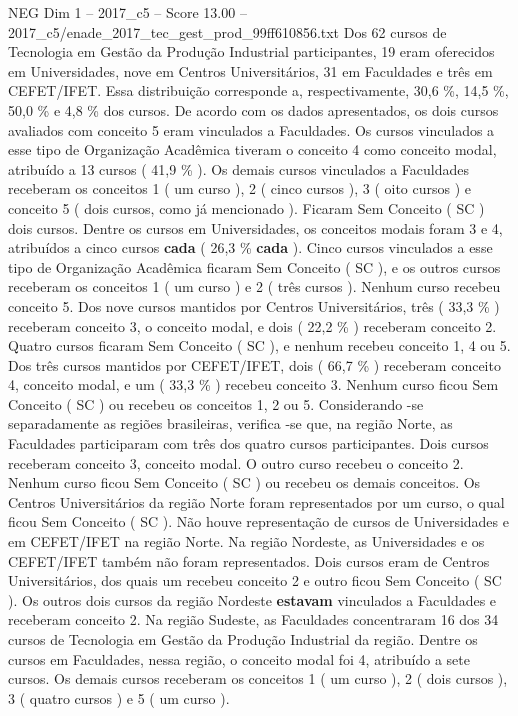 \begin{textsample}{NEG Dim 1 – 2017\_c5 – Score 13.00 – 2017\_c5/enade\_2017\_tec\_gest\_prod\_99ff610856.txt}
Dos 62 cursos de Tecnologia em Gestão da Produção Industrial participantes, 19 eram oferecidos em Universidades, nove em Centros Universitários, 31 em Faculdades e três em CEFET/IFET.
Essa distribuição corresponde a, respectivamente, 30,6 \%, 14,5 \%, 50,0 \% e 4,8 \% dos cursos.
De acordo com os dados apresentados, os dois cursos avaliados com conceito 5 eram vinculados a Faculdades.
Os cursos vinculados a esse tipo de Organização Acadêmica tiveram o conceito 4 como conceito modal, atribuído a 13 cursos ( 41,9 \% ).
Os demais cursos vinculados a Faculdades receberam os conceitos 1 ( um curso ), 2 ( cinco cursos ), 3 ( oito cursos ) e conceito 5 ( dois cursos, como já mencionado ).
Ficaram Sem Conceito ( SC ) dois cursos.
Dentre os cursos em Universidades, os conceitos modais foram 3 e 4, atribuídos a cinco cursos \textbf{cada} ( 26,3 \% \textbf{cada} ).
Cinco cursos vinculados a esse tipo de Organização Acadêmica ficaram Sem Conceito ( SC ), e os outros cursos receberam os conceitos 1 ( um curso ) e 2 ( três cursos ).
Nenhum curso recebeu conceito 5.
Dos nove cursos mantidos por Centros Universitários, três ( 33,3 \% ) receberam conceito 3, o conceito modal, e dois ( 22,2 \% ) receberam conceito 2.
Quatro cursos ficaram Sem Conceito ( SC ), e nenhum recebeu conceito 1, 4 ou 5.
Dos três cursos mantidos por CEFET/IFET, dois ( 66,7 \% ) receberam conceito 4, conceito modal, e um ( 33,3 \% ) recebeu conceito 3.
Nenhum curso ficou Sem Conceito ( SC ) ou recebeu os conceitos 1, 2 ou 5.
Considerando -se separadamente as regiões brasileiras, verifica -se que, na região Norte, as Faculdades participaram com três dos quatro cursos participantes.
Dois cursos receberam conceito 3, conceito modal.
O outro curso recebeu o conceito 2.
Nenhum curso ficou Sem Conceito ( SC ) ou recebeu os demais conceitos.
Os Centros Universitários da região Norte foram representados por um curso, o qual ficou Sem Conceito ( SC ).
Não houve representação de cursos de Universidades e em CEFET/IFET na região Norte.
Na região Nordeste, as Universidades e os CEFET/IFET também não foram representados.
Dois cursos eram de Centros Universitários, dos quais um recebeu conceito 2 e outro ficou Sem Conceito ( SC ).
Os outros dois cursos da região Nordeste \textbf{estavam} vinculados a Faculdades e receberam conceito 2.
Na região Sudeste, as Faculdades concentraram 16 dos 34 cursos de Tecnologia em Gestão da Produção Industrial da região.
Dentre os cursos em Faculdades, nessa região, o conceito modal foi 4, atribuído a sete cursos.
Os demais cursos receberam os conceitos 1 ( um curso ), 2 ( dois cursos ), 3 ( quatro cursos ) e 5 ( um curso ).

\end{textsample}
